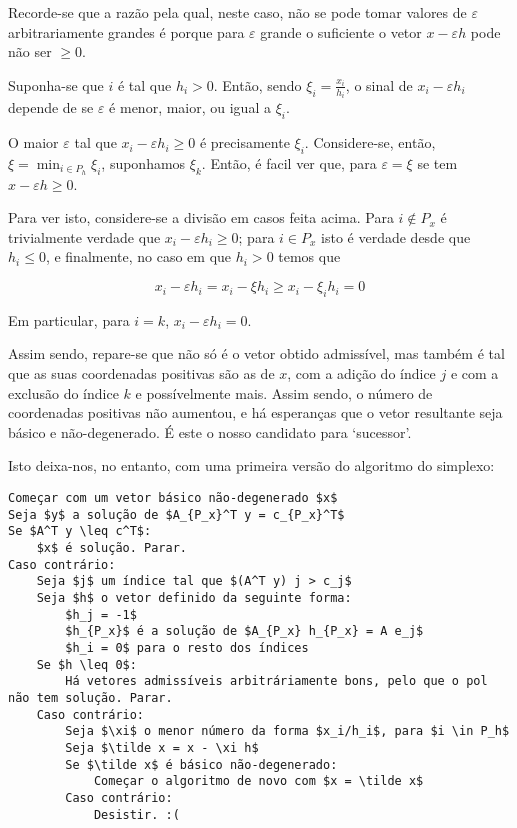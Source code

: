 \documentclass{article}
\theoremstyle{definition}
\begin{document}
	Recorde-se que a razão pela qual, neste caso, não se pode tomar valores de $\varepsilon$ arbitrariamente grandes é porque para $\varepsilon$ grande o suficiente o vetor $x - \varepsilon h$ pode não ser $\geq 0$.
	
	Suponha-se que $i$ é tal que $h_i > 0$. Então, sendo $\xi_i = \frac{x_i}{h_i}$, o sinal de $x_i - \varepsilon h_i$ depende de se $\varepsilon$ é menor, maior, ou igual a $\xi_i$.
	
	O maior $\varepsilon$ tal que $x_i - \varepsilon h_i \geq 0$ é precisamente $\xi_i$. Considere-se, então, $\xi = \min_{i \in P_h} \xi_i$, suponhamos $\xi_k$. Então, é facil ver que, para $\varepsilon = \xi$ se tem $x - \varepsilon h \geq 0$.
	
	Para ver isto, considere-se a divisão em casos feita acima. Para $i \not \in P_x$ é trivialmente verdade que $x_i - \varepsilon h_i \geq 0$; para $i \in P_x$ isto é verdade desde que $h_i \leq 0$, e finalmente, no caso em que $h_i > 0$ temos que
	
	\[x_i - \varepsilon h_i = x_i - \xi h_i \geq x_i - \xi_i h_i = 0\]
	
	Em particular, para $i = k$, $x_i - \varepsilon h_i = 0$.
	
	Assim sendo, repare-se que não só é o vetor obtido admissível, mas também é tal que as suas coordenadas positivas são as de $x$, com a adição do índice $j$ e com a exclusão do índice $k$ e possívelmente mais. Assim sendo, o número de coordenadas positivas não aumentou, e há esperanças que o vetor resultante seja básico e não-degenerado. É este o nosso candidato para `sucessor'.
	
	Isto deixa-nos, no entanto, com uma primeira versão do algoritmo do simplexo:
	
	\begin{lstlisting}
Começar com um vetor básico não-degenerado $x$
Seja $y$ a solução de $A_{P_x}^T y = c_{P_x}^T$
Se $A^T y \leq c^T$:
	$x$ é solução. Parar.
Caso contrário:
	Seja $j$ um índice tal que $(A^T y) j > c_j$
	Seja $h$ o vetor definido da seguinte forma:
		$h_j = -1$
		$h_{P_x}$ é a solução de $A_{P_x} h_{P_x} = A e_j$
		$h_i = 0$ para o resto dos índices
	Se $h \leq 0$:
		Há vetores admissíveis arbitráriamente bons, pelo que o pol não tem solução. Parar.
	Caso contrário:
		Seja $\xi$ o menor número da forma $x_i/h_i$, para $i \in P_h$
		Seja $\tilde x = x - \xi h$
		Se $\tilde x$ é básico não-degenerado:
			Começar o algoritmo de novo com $x = \tilde x$
		Caso contrário:
			Desistir. :(
	\end{lstlisting}
	
\end{document}
